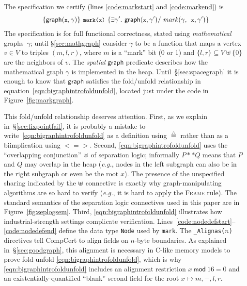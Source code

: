 \documentclass[acmsmall,screen]{acmart}  %
\newcommand{\li}[1]{{\texttt{\small #1}}} %
\newcommand{\scon}{\mathbin{\star}} %
\renewcommand{\scon}{\mathbin{\ast}} \renewcommand{\bigstar}{\raisebox{-0.24em}{{\scaleobj{2.5}{\scon}}}} %
\newcommand{\ocon}{ %
  \mathbin{\mbox{$\mathrlap{\cup}\hspace*{.09em} %
      \raisebox{.04em}[0ex][0ex]{$\scon$}$\hspace*{.07em}}}}
\newcommand{\defeq}{\mathbin{\stackrel{\triangle}{=}}} %
\newcommand{\p}[1]{\ensuremath{\mathsf{#1}}} \newcommand{\m}[1]{\ensuremath{\mathit{#1}}} \newcommand{\ma}[1]{\ensuremath{\mathcal{#1}}} \let\ramify\lightning
\newcommand{\infrulestyle}[1]{\textsc{#1}}
\begin{document}
{The specification we certify (lines \ref{code:markstart} and \ref{code:markend}) is
\vspace*{-1ex}
\[
\{\p{graph}(\li{x},\gamma)\}~\li{mark(x)}~\{\exists \gamma'.~ \p{graph}(\li{x},\gamma') /| \m{mark}(\gamma, \li{x}, \gamma')\}
\vspace*{-1ex}
\]
The specification is for full functional correctness, stated using \emph{mathematical} graphs~$\gamma$; until \S\ref{sec:mathgraph} consider $\gamma$ to be a function that maps a vertex $v \in V$ to triples $(m,l,r)$, where $m$ is a ``mark'' bit (0 or 1) and $\{l,r\} \subseteq V \uplus \{0\}$ are the neighbors of $v$.
The \emph{spatial} \p{graph} predicate describes how the mathematical graph $\gamma$ is implemented in the heap.  Until~\S\ref{sec:spacegraph} it is enough to know that \p{graph} satisfies the fold/unfold relationship in
equation~\eqref{eqn:bigraphintrofoldunfold}, located just under the code in Figure~\ref{fig:markgraph}.

This fold/unfold relationship deserves attention.
First, as we explain in~\S\ref{sec:fixpointfail}, it is probably a mistake to write~\eqref{eqn:bigraphintrofoldunfold} as a definition using $\defeq$ rather than as a biimplication using $<=>$.  Second, \eqref{eqn:bigraphintrofoldunfold} uses the ``overlapping conjunction'' $\ocon$ of separation logic; informally $P ** Q$ means that $P$ and $Q$ may overlap in the heap (\emph{e.g.}, nodes in the left subgraph can also be in the right subgraph or even be the root $x$).  The presence of the unspecified sharing indicated by the $\ocon$ connective is exactly why graph-manipulating algorithms are so hard to verify (\emph{e.g.}, it is hard to apply the \infrulestyle{Frame} rule).  The standard semantics of the separation logic connectives used in this paper are in Figure~\ref{fig:seplogsem}.
Third, \eqref{eqn:bigraphintrofoldunfold} illustrates how industrial-strength settings complicate verification.  Lines~\mbox{\ref{code:nodedefstart}--\ref{code:nodedefend}} define the data type \li{Node} used by \li{mark}.  The \li{\_Alignas(}$n$\li{)} directives tell CompCert to align fields on $n$-byte boundaries.  As explained in~\S\ref{sec:goodgraph}, this alignment is necessary in C-like memory models to prove fold-unfold \eqref{eqn:bigraphintrofoldunfold}, which is why \eqref{eqn:bigraphintrofoldunfold} includes an alignment restriction $x~\mathsf{mod}~16 = 0$ and an existentially-quantified ``blank'' second field for the root $x \mapsto m,-,l,r$.


}
\end{document}
